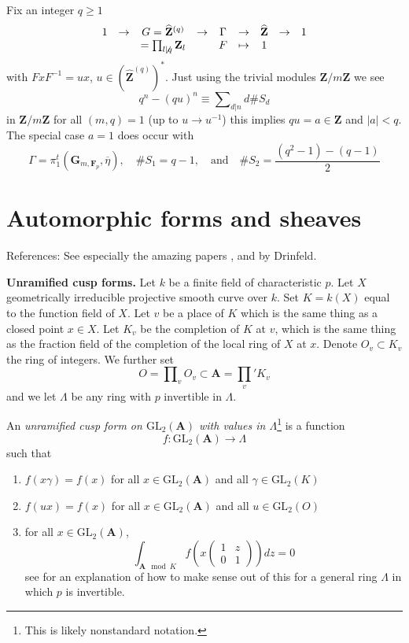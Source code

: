 \begin{example}
\label{example-commutative}
Fix an integer $q\geq 1$
$$
\begin{matrix}
1 &
\to &
G = \widehat{\mathbf{Z}}^{(q)} &
\to &
\Gamma &
\to &
\widehat{\mathbf{Z}} &
\to &
1 \\
&
&
= \prod_{l\not \mid q} \mathbf{Z}_l &
&
F &
\mapsto &
1
\end{matrix}
$$
with $FxF^{-1} = ux$, $u \in (\widehat{\mathbf{Z}}^{(q)})^*$.
Just using the trivial modules
$\mathbf{Z}/m\mathbf{Z}$ we see
$$
q^n - (qu)^n \equiv \sum\nolimits_{d|n} d\# S_d
$$
in $\mathbf{Z}/m\mathbf{Z}$ for all $(m, q)=1$ (up to
$u \to u^{-1}$) this implies $qu = a\in \mathbf{Z}$
and $|a| < q$. The special case $a = 1$ does occur with
$$
\Gamma = \pi_1^t(\mathbf{G}_{m, \mathbf{F}_p}, \overline \eta),
\quad
\# S_1 = q - 1,
\quad\text{and}\quad
\# S_2 = \frac{(q^2-1)-(q-1)}{2}
$$
\end{example}



\section{Automorphic forms and sheaves}
\label{section-automorphic}

\noindent
References: See especially the amazing papers
\cite{D1}, \cite{D2} and \cite{D0} by Drinfeld.

\medskip\noindent
{\bf Unramified cusp forms.}
Let $k$ be a finite field of characteristic $p$.
Let $X$ geometrically irreducible projective smooth curve over $k$.
Set $K = k(X)$ equal to the function field of $X$.
Let $v$ be a place of $K$ which is the same thing as a
closed point $x\in X$. Let $K_v$ be the completion of $K$ at $v$, which
is the same thing as the fraction field of the completion of
the local ring of $X$ at $x$.
Denote $O_v\subset K_v$ the ring of integers. We further set
$$
O = \prod\nolimits_v O_v \subset \mathbf{A} = \prod_v' K_v
$$
and we let $\Lambda$ be any ring with $p$ invertible in $\Lambda$.

\begin{definition}
\label{definition-unramified}
An {\it unramified cusp form on $\text{GL}_2(\mathbf{A})$ with values in
$\Lambda$}\footnote{This is likely nonstandard notation.}
is a function
$$
f : \text{GL}_2(\mathbf{A}) \to \Lambda
$$
such that
\begin{enumerate}
\item $f(x\gamma) = f(x)$ for all $x\in \text{GL}_2(\mathbf{A})$ and all
$\gamma\in \text{GL}_2(K)$
\item $f(ux) = f(x)$ for all $x\in \text{GL}_2(\mathbf{A})$ and all
$u\in \text{GL}_2(O)$
\item for all $x\in \text{GL}_2(\mathbf{A})$,
$$
\int_{\mathbf{A} \mod K} f
\left(x
\left(
\begin{matrix}
1 & z \\
0 & 1
\end{matrix}
\right)
\right) dz = 0
$$
see \cite[Section 4.1]{dJ-conjecture}
for an explanation of how to make sense out
of this for a general ring $\Lambda$ in which $p$ is invertible.
\end{enumerate}
\end{definition}

